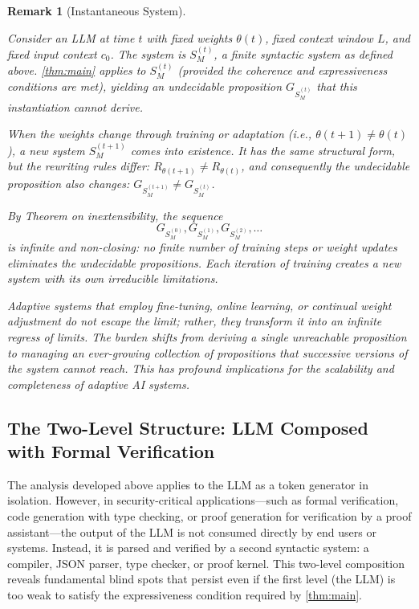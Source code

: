 \documentclass[11pt]{article}
\newtheorem{remark}[theorem]{Remark}
\begin{document}
\begin{remark}[Instantaneous System]
\label{rem:temporal_snapshot}

Consider an LLM at time $t$ with fixed weights $\theta(t)$, fixed context window $L$, and fixed input context $c_0$. The system is $S_M^{(t)}$, a finite syntactic system as defined above. \ref{thm:main} applies to $S_M^{(t)}$ (provided the coherence and expressiveness conditions are met), yielding an undecidable proposition $G_{S_M^{(t)}}$ that this instantiation cannot derive.

When the weights change through training or adaptation (i.e., $\theta(t+1) \ne \theta(t)$), a new system $S_M^{(t+1)}$ comes into existence. It has the same structural form, but the rewriting rules differ: $R_{\theta(t+1)} \ne R_{\theta(t)}$, and consequently the undecidable proposition also changes: $G_{S_M^{(t+1)}} \ne G_{S_M^{(t)}}$.

By Theorem on inextensibility, the sequence 
\begin{equation}
G_{S_M^{(0)}}, G_{S_M^{(1)}}, G_{S_M^{(2)}}, \ldots
\end{equation}
is infinite and non-closing: no finite number of training steps or weight updates eliminates the undecidable propositions. Each iteration of training creates a new system with its own irreducible limitations.

Adaptive systems that employ fine-tuning, online learning, or continual weight adjustment do not escape the limit; rather, they transform it into an infinite regress of limits. The burden shifts from deriving a single unreachable proposition to managing an ever-growing collection of propositions that successive versions of the system cannot reach. This has profound implications for the scalability and completeness of adaptive AI systems.

\end{remark}

\subsection{The Two-Level Structure: LLM Composed with Formal Verification}
\label{subsec:two_level}

The analysis developed above applies to the LLM as a token generator in isolation. However, in security-critical applications—such as formal verification, code generation with type checking, or proof generation for verification by a proof assistant—the output of the LLM is not consumed directly by end users or systems. Instead, it is parsed and verified by a second syntactic system: a compiler, JSON parser, type checker, or proof kernel. This two-level composition reveals fundamental blind spots that persist even if the first level (the LLM) is too weak to satisfy the expressiveness condition required by \ref{thm:main}.
\end{document}
